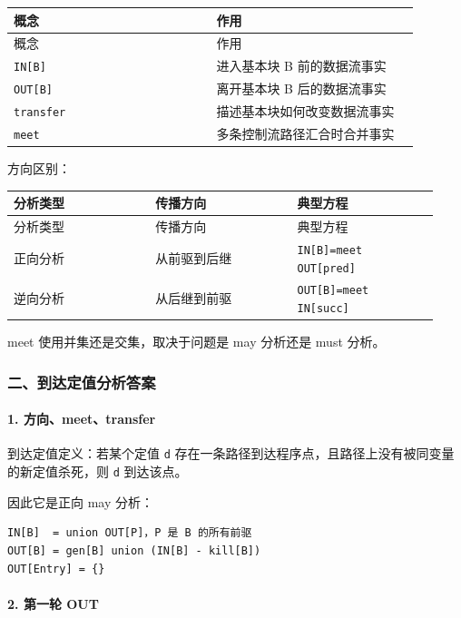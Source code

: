 \documentclass[UTF8]{ctexart}
\begin{document}
\begin{longtable}{|p{0.47\linewidth}|p{0.47\linewidth}|}
\hline
概念 & 作用 \\
\hline
\endfirsthead
概念 & 作用 \\
\hline
\endhead
\texttt{IN[B]} & 进入基本块 B 前的数据流事实 \\
\hline
\texttt{OUT[B]} & 离开基本块 B 后的数据流事实 \\
\hline
\texttt{transfer} & 描述基本块如何改变数据流事实 \\
\hline
\texttt{meet} & 多条控制流路径汇合时合并事实 \\
\hline
\end{longtable}

方向区别：

\begin{longtable}{|p{0.31\linewidth}|p{0.31\linewidth}|p{0.31\linewidth}|}
\hline
分析类型 & 传播方向 & 典型方程 \\
\hline
\endfirsthead
分析类型 & 传播方向 & 典型方程 \\
\hline
\endhead
正向分析 & 从前驱到后继 & \texttt{IN[B]=meet OUT[pred]} \\
\hline
逆向分析 & 从后继到前驱 & \texttt{OUT[B]=meet IN[succ]} \\
\hline
\end{longtable}

meet 使用并集还是交集，取决于问题是 may 分析还是 must 分析。

\subsubsection*{二、到达定值分析答案}

\paragraph*{1. 方向、meet、transfer}

到达定值定义：若某个定值 \texttt{d} 存在一条路径到达程序点，且路径上没有被同变量的新定值杀死，则 \texttt{d} 到达该点。

因此它是正向 may 分析：

\begin{Verbatim}[fontsize=\small,breaklines=true]
IN[B]  = union OUT[P]，P 是 B 的所有前驱
OUT[B] = gen[B] union (IN[B] - kill[B])
OUT[Entry] = {}
\end{Verbatim}

\paragraph*{2. 第一轮 OUT}
\end{document}

